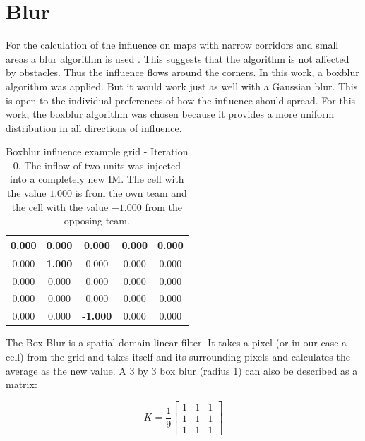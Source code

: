 \documentclass[]{report}
\begin{document}
		\section{Blur } \label{ssec:num1}
		For the calculation of the influence on maps with narrow corridors and small areas a blur algorithm is used \citep{gameDevInfluenceMap}. This suggests that the algorithm is not affected by obstacles. Thus the influence flows around the corners. In this work, a boxblur algorithm was applied. But it would work just as well with a Gaussian blur. This is open to the individual preferences of how the influence should spread. For this work, the boxblur algorithm was chosen because it provides a more uniform distribution in all directions of influence. 
		
		\begin{table}[H]
			\centering
			\begin{tabular}{|c|c|c|c|c|}
				\hline
				0.000 & 0.000 & 0.000 & 0.000 & 0.000\\
				\hline
				0.000 & \textbf{1.000} & 0.000 & 0.000 & 0.000\\
				\hline
				0.000 & 0.000 & 0.000 & 0.000 & 0.000\\
				\hline
				0.000 & 0.000 & 0.000 & 0.000 & 0.000\\
				\hline
				0.000 & 0.000 & \textbf{-1.000} & 0.000 & 0.000\\
				\hline
				
			\end{tabular}
			\caption{Boxblur influence example grid - Iteration 0. The inflow of two units was injected into a completely new \ac{IM}. The cell with the value $1.000$ is from the own team and the cell with the value $-1.000$ from the opposing team. }
			\label{tab:Boxblur grid Iteration 0}
		\end{table}
		
		The Box Blur is a spatial domain linear filter. It takes a pixel (or in our case a cell) from the grid and takes itself and its surrounding pixels and calculates the average as the new value. A 3 by 3 box blur (radius 1) can also be described as a matrix:
		
		\begin{equation}
			K = \frac{1}{9}\begin{bmatrix} 1 & 1 & 1\\ 1 & 1 & 1\\ 1 & 1 & 1 \end{bmatrix}
		\end{equation}
	
\end{document}
